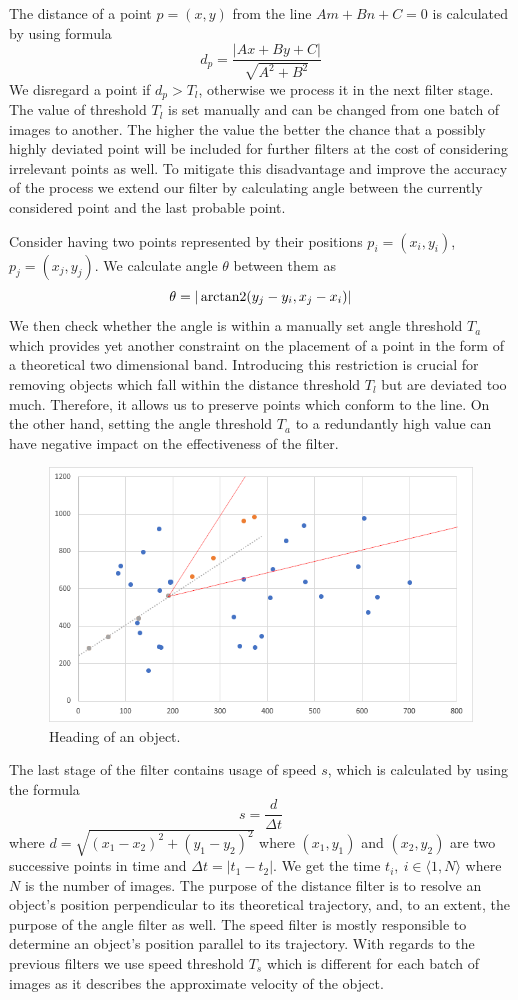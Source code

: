 	The distance of a point $p=(x,y)$ from the line $Am+Bn+C=0$ is calculated by using formula $$d_p=\frac{|Ax+By+C|}{\sqrt{A^2+B^2}}$$ We disregard a point if $d_p>T_l$, otherwise we process it in the next filter stage. The value of threshold $T_l$ is set manually and can be changed from one batch of images to another. The higher the value the better the chance that a possibly highly deviated point will be included for further filters at the cost of considering irrelevant points as well. To mitigate this disadvantage and improve the accuracy of the process we extend our filter by calculating angle between the currently considered point and the last probable point.
	
	Consider having two points represented by their positions $p_{i}=(x_i,y_i)$, $p_j=(x_j,y_j)$. We calculate angle $\theta$ between them as $$\theta=|\operatorname{arctan2}(y_j-y_i, x_j-x_i)|$$ We then check whether the angle is within a manually set angle threshold $T_a$ which provides yet another constraint on the placement of a point in the form of a theoretical two dimensional band. Introducing this restriction is crucial for removing objects which fall within the distance threshold $T_l$ but are deviated too much. Therefore, it allows us to preserve points which conform to the line. On the other hand, setting the angle threshold $T_a$ to a redundantly high value can have negative impact on the effectiveness of the filter.
	
	\begin{figure}[H]
	\centering
	  \includegraphics[width=12cm]{images/regresia2}
		  \caption{Heading of an object.}
	  \label{fig:regresia2}
	\end{figure}
		
	The last stage of the filter contains usage of speed $s$, which is calculated by using the formula $$s=\frac{d}{{\Delta}t}$$ where $d=\sqrt{(x_1-x_2)^2 + (y_1-y_2)^2}$ where $(x_1,y_1)$ and $(x_2,y_2)$ are two successive points in time and ${\Delta}t=|t_1-t_2|$. We get the time $t_{i},\ i\in\langle1,N\rangle$ where $N$ is the number of images. The purpose of the distance filter is to resolve an object's position perpendicular to its theoretical trajectory, and, to an extent, the purpose of the angle filter as well. The speed filter is mostly responsible to determine an object's position parallel to its trajectory. With regards to the previous filters we use speed threshold $T_s$ which is different for each batch of images as it describes the approximate velocity of the object.
	
